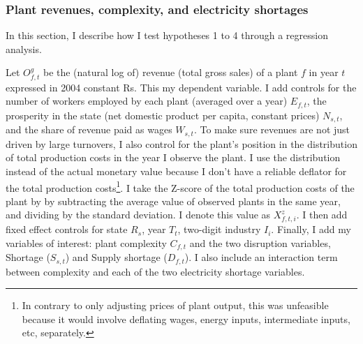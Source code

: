 \documentclass[11pt]{article}
\begin{document}
\subsubsection{Plant revenues, complexity, and electricity shortages}\label{sub:interaction_emp_strat}

In this section, I describe how I test hypotheses 1 to 4 through a regression analysis.

Let $O^{g}_{f,t}$ be the (natural log of) revenue (total gross sales) of a plant $f$ in year $t$ expressed in 2004 constant Rs. This my dependent variable. I add controls for the number of workers employed by each plant (averaged over a year) $E_{f,t}$, the prosperity in the state (net domestic product per capita, constant prices) $N_{s,t}$, and the share of revenue paid as wages $W_{s,t}$. To make sure revenues are not just driven by large turnovers, I also control for the plant's position in the distribution of total production costs in the year I observe the plant. I use the distribution instead of the actual monetary value because I don't have a reliable deflator for the total production costs\footnote{In contrary to only adjusting prices of plant output, this was unfeasible because it would involve deflating wages, energy inputs, intermediate inputs, etc, separately.}. I take the Z-score of the total production costs of the plant by by subtracting the average value of observed plants in the same year, and dividing by the standard deviation. I denote this value as $X^{z}_{f,t,i}$. I then add fixed effect controls for state $R_{s}$, year $T_{t}$, two-digit industry $I_i$. Finally, I add my variables of interest: plant complexity $C_{f,t}$ and the two disruption variables, Shortage ($S_{s,t}$) and Supply shortage ($D_{f,t}$). I also include an interaction term between complexity and each of the two electricity shortage variables.
\end{document}
